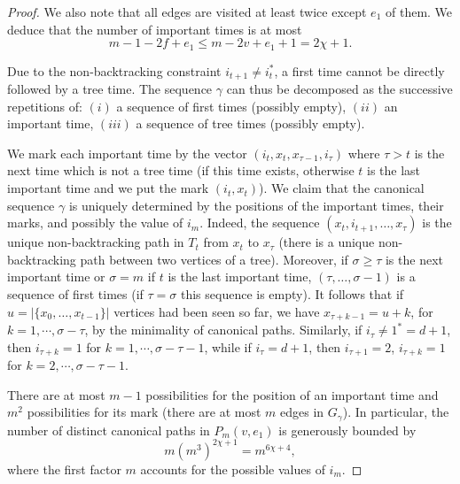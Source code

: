 \documentclass[11pt]{article}
\newcommand{\1}{1\!\!{\sf I}}
\begin{document}
\begin{proof}
We also note that all edges are visited at least twice except $e_1$ of them. We deduce that the number of important times is at most 
$$
m-1 - 2 f + e_1 \leq m - 2 v + e_1 +1 = 2 \chi +1. 
$$


Due to the non-backtracking constraint $i_{t+1} \ne i_t^*$, a first time cannot be directly followed by a tree time. The sequence $\gamma$ can thus be decomposed as 
the successive repetitions of: $(i)$ a sequence of first times (possibly empty), $(ii)$ an important time, 
$(iii)$ a sequence of tree times (possibly empty).

We mark each important time by the vector $(i_t,x_{t}, x_{\tau-1},i_{\tau})$ where $\tau > t$ is the next time which is not a tree time (if this time exists, otherwise $t$ is the last important time and we put the mark $(i_t,x_t)$).
We claim that the canonical sequence $\gamma$ is 
uniquely determined by the positions of the important times, their marks, and possibly the value of $i_m$. Indeed, the sequence $(x_{t},i_{t+1}, \ldots, x_{\tau})$ is the unique non-backtracking path in $T_t$ from $x_{t}$ to $x_\tau$ (there is a unique non-backtracking path between two vertices of a tree). Moreover, if $\sigma \geq \tau$ is the next important time or $\sigma = m$ if $t$ is the last important time, $(\tau, \ldots, \sigma-1)$ is a sequence of first times (if $\tau = \sigma$ this sequence is empty). It follows that if $u = |\{x_0,\ldots,x_{t-1}\}|$ vertices had been seen so far, we have $x_{\tau + k-1} = u+k$, for $k = 1, \cdots, \sigma- \tau$, by the minimality of canonical paths. Similarly, if $i_{\tau} \ne 1^* = d+1$, then $i_{\tau + k} = 1$ for  $k = 1, \cdots, \sigma- \tau-1$, while if $i_{\tau} = d+1$, then $i_{\tau + 1} = 2$, $i_{\tau + k} = 1$ for $k = 2, \cdots, \sigma- \tau-1$.

There are at most $m-1$ possibilities for the position of an important time and $m^2$ possibilities for its mark 
(there are at most $m$ edges in $G_\gamma$). In particular, the number of distinct canonical paths in $P_{m} (v,e_1)$ 
is generously bounded by 
$$
m (m^3)^{2 \chi+1} = m^{6\chi + 4},
$$
where the first factor $m$ accounts for the possible values of $i_m$.  \end{proof}
\end{document}
